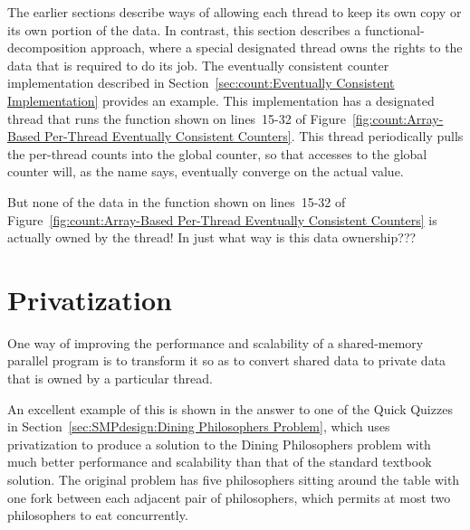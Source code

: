 The earlier sections describe ways of allowing each thread to keep its
own copy or its own portion of the data.
In contrast, this section describes a functional-decomposition approach,
where a special designated thread owns the rights to the data
that is required to do its job.
The eventually consistent counter implementation described in
Section~\ref{sec:count:Eventually Consistent Implementation} provides an example.
This implementation has a designated thread that runs the
 function shown on lines~15-32 of
Figure~\ref{fig:count:Array-Based Per-Thread Eventually Consistent Counters}.
This  thread periodically pulls the per-thread counts
into the global counter, so that accesses to the global counter will,
as the name says, eventually converge on the actual value.

\QuickQuiz{}
	But none of the data in the  function shown on
	lines~15-32 of
	Figure~\ref{fig:count:Array-Based Per-Thread Eventually Consistent Counters}
	is actually owned by the  thread!
	In just what way is this data ownership???
 \QuickQuizEnd

\section{Privatization}
\label{sec:owned:Privatization}

One way of improving the performance and scalability of a shared-memory
parallel program is to transform it so as to convert shared data to
private data that is owned by a particular thread.

An excellent example of this is shown in the answer to one of the
Quick Quizzes in
Section~\ref{sec:SMPdesign:Dining Philosophers Problem},
which uses privatization to produce a solution to the
Dining Philosophers problem with much better performance and scalability
than that of the standard textbook solution.
The original problem has five philosophers sitting around the table
with one fork between each adjacent pair of philosophers, which permits
at most two philosophers to eat concurrently.

